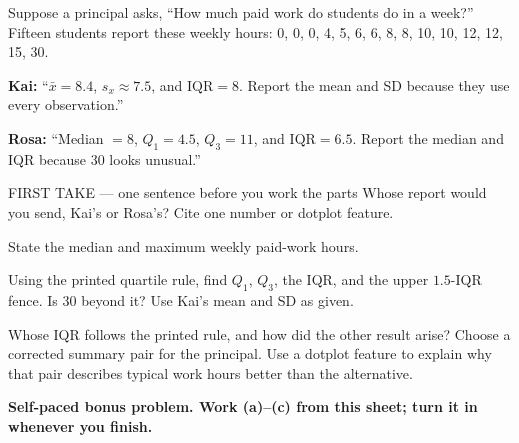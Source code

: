 \documentclass[14pt]{extarticle}
\begin{document}
\pagestyle{empty}


\noindent\begin{minipage}[t]{0.57\linewidth}
\vspace{0pt}
Suppose a principal asks, ``How much paid work do students do in a week?'' Fifteen students report these weekly hours: 0, 0, 0, 4, 5, 6, 6, 8, 8, 10, 10, 12, 12, 15, 30.\par\smallskip \textbf{Kai:} ``$\bar{x}=8.4$, $s_x\approx7.5$, and $\mathrm{IQR}=8$. Report the mean and SD because they use every observation.''\par \textbf{Rosa:} ``Median $=8$, $Q_1=4.5$, $Q_3=11$, and $\mathrm{IQR}=6.5$. Report the median and IQR because 30 looks unusual.''\par
\end{minipage}\hfill
\begin{minipage}[t]{0.40\linewidth}
\vspace{0pt}
\begin{center}
\end{center}
\end{minipage}

\begin{firsttakebox}{FIRST TAKE --- one sentence before you work the parts}
Whose report would you send, Kai's or Rosa's? Cite one number or dotplot feature.
\end{firsttakebox}

\begin{description}[leftmargin=1.15in, labelwidth=1in, itemsep=2pt, topsep=2pt]
  \item[\dokbadge{1}~(a)] State the median and maximum weekly paid-work hours.
  \item[\dokbadge{2}~(b)] Using the printed quartile rule, find $Q_1$, $Q_3$, the IQR, and the upper $1.5$-IQR fence. Is 30 beyond it? Use Kai's mean and SD as given.
  \item[\dokbadge{3}~(c)] Whose IQR follows the printed rule, and how did the other result arise? Choose a corrected summary pair for the principal. Use a dotplot feature to explain why that pair describes typical work hours better than the alternative.
\end{description}

\vfill
\textbf{Self-paced bonus problem. Work (a)--(c) from this sheet; turn it in whenever you finish.}
\end{document}
